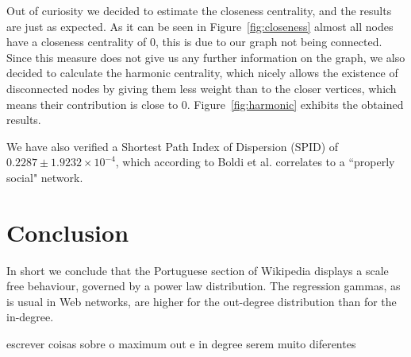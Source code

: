 \documentclass[9pt,a4paper,twocolumn]{article}
\begin{document}
Out of curiosity we decided to estimate the closeness centrality, and the results are just as expected. As it can be seen in Figure~\ref{fig:closeness} almost all nodes have a closeness centrality of 0, this is due to our graph not being connected. Since this measure does not give us any further information on the graph, we also decided to calculate the harmonic centrality, which nicely allows the existence of disconnected nodes by giving them less weight than to the closer vertices, which means their contribution is close to 0. Figure~\ref{fig:harmonic} exhibits the obtained results.

We have also verified a Shortest Path Index of Dispersion (SPID) of $0.2287 \pm 1.9232 \times 10^{-4}$, which according to Boldi et al. \cite{Boldi2011HyperANFAT} correlates to a ``properly social" network.

\section{Conclusion}

In short we conclude that the Portuguese section of Wikipedia displays a scale free behaviour, governed by a power law distribution. The regression gammas, as is usual in Web networks, are higher for the out-degree distribution than for the in-degree.


escrever coisas sobre o maximum out e in degree serem muito diferentes

\printglossary[type=\acronymtype]



\end{document}
